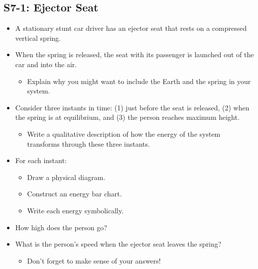 \documentclass[]{article}
\begin{document}
\begin{PresentSpace}
\vspace{-10pt}
\section*{S7-1: Ejector Seat}
\vspace{-10pt}
\begin{itemize}
	\large
	\item A stationary stunt car driver has an ejector seat that rests on a compressed vertical spring.
	\item When the spring is released, the seat with its passenger is launched out of the car and into the air.
	\begin{itemize}
		\normalsize
		\item Explain why you might want to include the Earth and the spring in your system.
	\end{itemize}
	\item Consider three instants in time: (1) just before the seat is released, (2) when the spring is at equilibrium, and (3) the person reaches maximum height.
	\begin{itemize}
		\normalsize
		\item Write a qualitative description of how the energy of the system transforms through these three instants.
	\end{itemize}
	\item For each instant:
	\begin{itemize}
		\normalsize
		\item Draw a physical diagram.
		\item Construct an energy bar chart.
		\item Write each energy symbolically.
	\end{itemize}
	\item How high does the person go?
	\item What is the person's speed when the ejector seat leaves the spring?
	\begin{itemize}
		\item Don't forget to make sense of your answers!
	\end{itemize}
\end{itemize}
\end{PresentSpace}
\newpage
\end{document}
